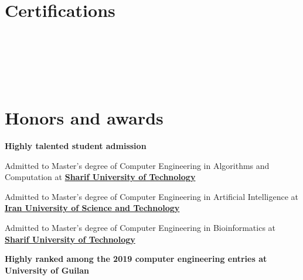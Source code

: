 \documentclass[letterpaper]{resume} %
\begin{document}
\begin{minipage}[t]{0.55\textwidth}
\begin{tightitemize}
\end{tightitemize}

\sectionspace %


\section{Certifications}

 \\

\sectionspace %

 \\

\sectionspace %

 \\

\sectionspace %


\section{Honors and awards}

{\bf Highly talented student admission}
\begin{tightitemize}
\item Admitted to Master's degree of Computer Engineering in Algorithms and Computation at \href{https://www.sharif.edu}{\bf Sharif University of Technology}
\item Admitted to Master's degree of Computer Engineering in Artificial Intelligence at \href{https://www.iust.ac.ir/}{\bf Iran University of Science and Technology}
\item Admitted to Master's degree of Computer Engineering in Bioinformatics at \href{https://www.sharif.edu}{\bf Sharif University of Technology}
\end{tightitemize}

\sectionspace %

{\bf Highly ranked among the 2019 computer engineering entries at University of Guilan}

\sectionspace %


\end{minipage} %
\end{document}

